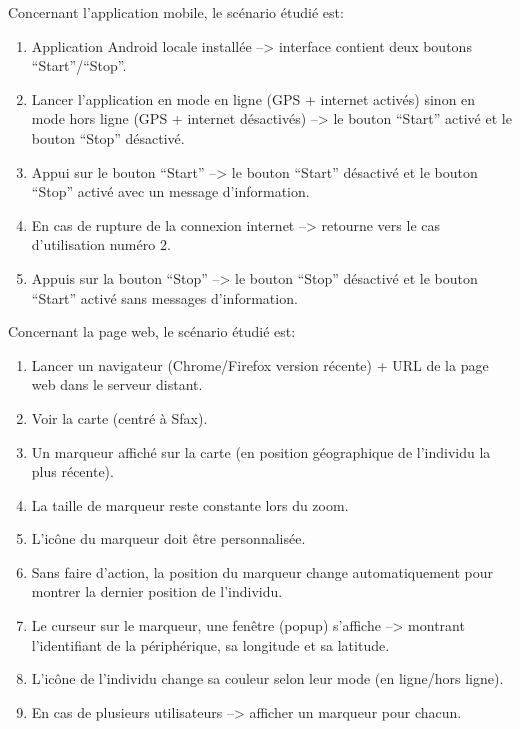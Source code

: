 Concernant l'application mobile, le scénario étudié est:

\begin{enumerate}
    \item Application Android locale installée --> interface contient deux
        boutons ``Start''/``Stop''.
    \item Lancer l'application en mode en ligne (\acrshort{GPS} + internet
        activés) sinon en mode hors ligne (\acrshort{GPS} + internet
        désactivés) --> le bouton ``Start'' activé et le bouton ``Stop''
        désactivé.
    \item Appui sur le bouton ``Start'' -->  le bouton ``Start'' désactivé et
        le bouton ``Stop'' activé avec un message d'information.
    \item En cas de rupture de la connexion internet --> retourne vers le cas
        d'utilisation numéro 2.
    \item Appuis sur la bouton ``Stop'' --> le bouton ``Stop'' désactivé et le
        bouton ``Start'' activé sans messages d'information.
\end{enumerate}

Concernant la page web, le scénario étudié est:

\begin{enumerate}
    \item Lancer un navigateur (Chrome/Firefox version récente) + URL de la
        page web dans le serveur distant.
    \item Voir la carte (centré à Sfax).
    \item Un marqueur affiché sur la carte (en position géographique de
        l'individu la plus récente).
    \item La taille de marqueur reste constante lors du zoom.
    \item L'icône du marqueur doit être personnalisée.
    \item Sans faire d'action, la position du marqueur change automatiquement
        pour montrer la dernier position de l'individu.
    \item Le curseur sur le marqueur, une fenêtre (popup) s'affiche -->
        montrant l'identifiant de la périphérique, sa longitude et sa latitude.
    \item L'icône de l'individu change sa couleur selon leur mode (en
        ligne/hors ligne).
    \item En cas de plusieurs utilisateurs --> afficher un marqueur pour
        chacun.
\end{enumerate}

